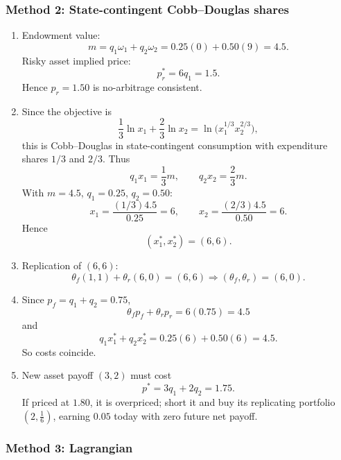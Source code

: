 \documentclass[12pt]{article}
\begin{document}
\newpage
\subsubsection*{Method 2: State-contingent Cobb--Douglas shares}

\begin{enumerate}[label=(\alph*)]
\item Endowment value:
\[
m=q_1\omega_1+q_2\omega_2=0.25(0)+0.50(9)=4.5.
\]
Risky asset implied price:
\[
p_r^*=6q_1=1.5.
\]
Hence \(p_r=1.50\) is no-arbitrage consistent.

\item Since the objective is
\[
\frac13\ln x_1+\frac23\ln x_2=\ln\!\big(x_1^{1/3}x_2^{2/3}\big),
\]
this is Cobb--Douglas in state-contingent consumption with expenditure shares \(1/3\) and \(2/3\). Thus
\[
q_1x_1=\frac13 m,\qquad q_2x_2=\frac23 m.
\]
With \(m=4.5\), \(q_1=0.25\), \(q_2=0.50\):
\[
x_1=\frac{(1/3)4.5}{0.25}=6,\qquad
x_2=\frac{(2/3)4.5}{0.50}=6.
\]
Hence
\[
\boxed{(x_1^*,x_2^*)=(6,6).}
\]

\item Replication of \((6,6)\):
\[
\theta_f(1,1)+\theta_r(6,0)=(6,6)
\Rightarrow (\theta_f,\theta_r)=(6,0).
\]

\item Since \(p_f=q_1+q_2=0.75\),
\[
\theta_fp_f+\theta_rp_r=6(0.75)=4.5
\]
and
\[
q_1x_1^*+q_2x_2^*=0.25(6)+0.50(6)=4.5.
\]
So costs coincide.

\item New asset payoff \((3,2)\) must cost
\[
p^*=3q_1+2q_2=1.75.
\]
If priced at \(1.80\), it is overpriced; short it and buy its replicating portfolio \(\left(2,\frac16\right)\), earning \(0.05\) today with zero future net payoff.
\end{enumerate}

\newpage
\subsubsection*{Method 3: Lagrangian}
\end{document}
